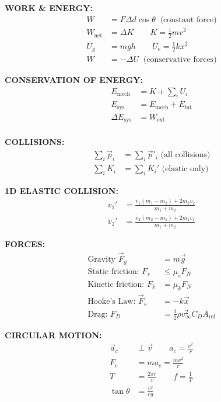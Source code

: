 \documentclass[11pt]{article}
\newcommand{\sk}{\quad\quad}
\begin{document}
\begin{multicols*}{3}
  \textbf{WORK \& ENERGY:}
  \begin{align*}
    W &= F\Delta d\cos\theta\;\;\text{(constant force)}\\
    W_\text{net} &= \Delta K\sk K = \frac12mv^2\\
    U_g &= mgh\sk U_e = \frac12kx^2\\
    W &=-\Delta U\;\;\text{(conservative forces)}
  \end{align*}


  \textbf{CONSERVATION OF ENERGY:}
  \begin{align*}
    E_\text{mech} &=K+\sum_i U_i\\
    E_\text{sys}&=E_\text{mech}+E_\text{int}\\
    \Delta E_\text{sys} &=W_\text{ext}\\
  \end{align*}
  
  \textbf{COLLISIONS:}
  \begin{align*}
    \sum_i\vec p_i &=\sum_i\vec p'_i\text{ (all collisions)}\\
    \sum_iK_i &=\sum_iK_i'\text{ (elastic only)}
  \end{align*}

  \textbf{1D ELASTIC COLLISION:}
  \begin{align*}
    v_1'&=\frac{v_1(m_1-m_2)+2m_2v_2}{m_1+m_2}\\
    v_2'&=\frac{v_2(m_2-m_1)+2m_1v_1}{m_1+m_2}
  \end{align*}
  
  \textbf{FORCES:}
  \begin{align*}
    \text{Gravity }\vec F_g &=m\vec g\\
    \text{Static friction: } F_s &\leq \mu_sF_N\\
    \text{Kinetic friction: } F_k &= \mu_kF_N\\
    \text{Hooke's Law: }\vec F_s &= -k\vec x\\
    \text{Drag: }F_D&=\frac12\rho v_\infty^2C_DA_\text{ref}
  \end{align*}

  
  \textbf{CIRCULAR MOTION:}
  \begin{align*}
    \vec a_c&\perp\vec v\sk a_c=\frac{v^2}r\\
    F_c&=ma_c=\frac{mv^2}r\\
    T&=\frac{2\pi r}v\sk f=\frac1T\\
    \tan\theta&=\frac{v^2}{rg}
  \end{align*}


\end{multicols*}
\end{document}
